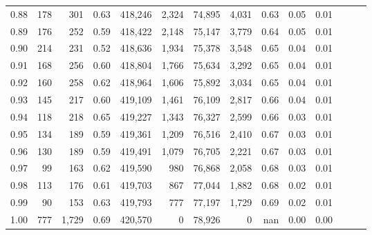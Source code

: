 \begin{tabular}{rrrrrrrrrrrrrr}
0.88 &     178 &    301 &  0.63 &  418,246 &    2,324 &  74,895 &   4,031 &  0.63 &  0.05 &      0.01 \\
0.89 &     176 &    252 &  0.59 &  418,422 &    2,148 &  75,147 &   3,779 &  0.64 &  0.05 &      0.01 \\
0.90 &     214 &    231 &  0.52 &  418,636 &    1,934 &  75,378 &   3,548 &  0.65 &  0.04 &      0.01 \\
0.91 &     168 &    256 &  0.60 &  418,804 &    1,766 &  75,634 &   3,292 &  0.65 &  0.04 &      0.01 \\
0.92 &     160 &    258 &  0.62 &  418,964 &    1,606 &  75,892 &   3,034 &  0.65 &  0.04 &      0.01 \\
0.93 &     145 &    217 &  0.60 &  419,109 &    1,461 &  76,109 &   2,817 &  0.66 &  0.04 &      0.01 \\
0.94 &     118 &    218 &  0.65 &  419,227 &    1,343 &  76,327 &   2,599 &  0.66 &  0.03 &      0.01 \\
0.95 &     134 &    189 &  0.59 &  419,361 &    1,209 &  76,516 &   2,410 &  0.67 &  0.03 &      0.01 \\
0.96 &     130 &    189 &  0.59 &  419,491 &    1,079 &  76,705 &   2,221 &  0.67 &  0.03 &      0.01 \\
0.97 &      99 &    163 &  0.62 &  419,590 &      980 &  76,868 &   2,058 &  0.68 &  0.03 &      0.01 \\
0.98 &     113 &    176 &  0.61 &  419,703 &      867 &  77,044 &   1,882 &  0.68 &  0.02 &      0.01 \\
0.99 &      90 &    153 &  0.63 &  419,793 &      777 &  77,197 &   1,729 &  0.69 &  0.02 &      0.01 \\
1.00 &     777 &  1,729 &  0.69 &  420,570 &        0 &  78,926 &       0 &   nan &  0.00 &      0.00 \\
\bottomrule
\end{tabular}
